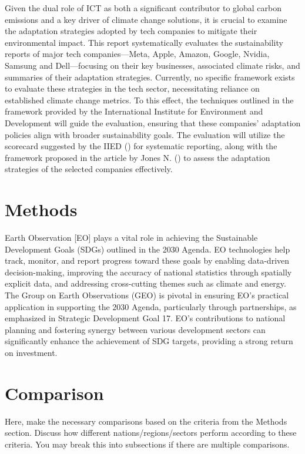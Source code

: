 \documentclass[12pt]{article}
\begin{document}
Given the dual role of ICT as both a significant contributor to global carbon emissions and a 
key driver of climate change solutions, it is crucial to examine the adaptation strategies 
adopted by tech companies to mitigate their environmental impact. This report systematically 
evaluates the sustainability reports of major tech companies—Meta, Apple, Amazon, Google, Nvidia, 
Samsung and Dell—focusing on their key businesses, associated climate risks, and summaries of 
their adaptation strategies. Currently, no specific 
framework exists to evaluate these strategies in the tech sector, necessitating reliance on established climate change 
metrics. To this effect, the techniques outlined in the framework provided by the International Institute for Environment and Development 
will guide the evaluation, ensuring that these companies’ adaptation policies align with broader sustainability goals. The evaluation will utilize 
the scorecard suggested by the IIED (\cite{craft_2016}) for systematic reporting, along with the framework proposed in the article by Jones N. (\cite{jones_2001}) 
to assess the adaptation strategies of the selected companies effectively.

\pagebreak
\section*{Methods}
Earth Observation [EO] plays a vital role in achieving the Sustainable Development Goals (SDGs) outlined in the 2030 Agenda. EO technologies help track, monitor, 
and report progress toward these goals by enabling data-driven decision-making, improving the accuracy of national statistics through spatially explicit data, and 
addressing cross-cutting themes such as climate and energy. The Group on Earth Observations (GEO) is pivotal in ensuring EO's practical application in 
supporting the 2030 Agenda, particularly through partnerships, as emphasized in Strategic Development Goal 17. EO's contributions to national planning and fostering 
synergy between various development sectors can significantly enhance the achievement of SDG targets, providing a strong return on investment.


\section*{Comparison}
Here, make the necessary comparisons based on the criteria from the Methods section. Discuss how different nations/regions/sectors perform according to these criteria. You may break this into subsections if there are multiple comparisons.
\end{document}
